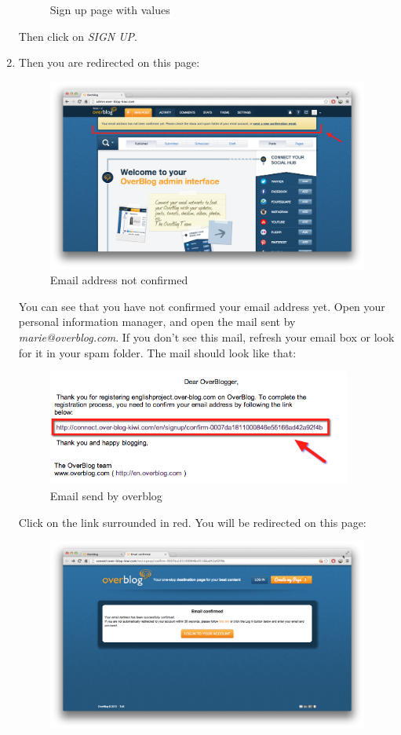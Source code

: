 \documentclass[a4paper,10pt]{article}
\begin{document}
\begin{enumerate}
\begin{figure}[H]
    \caption{Sign up page with values}
\end{figure}
Then click on \emph{SIGN UP}.
\item Then you are redirected on this page:
\begin{figure}[H]
    \center
	\includegraphics[width=13cm]{Images/addressMailNotConfirmed.png}
    \caption{Email address not confirmed}
\end{figure}
You can see that you have not confirmed your email address yet. Open your personal information manager, and open the mail sent by \emph{marie@overblog.com}. If you don't see this mail, refresh your email box or look for it in your spam folder. The mail should look like that: 
\begin{figure}[H]
    \center
	\includegraphics[width=10cm]{Images/emailOverblog.png}
    \caption{Email send by overblog}
\end{figure}
Click on the link surrounded in red. You will be redirected on this page:
\begin{figure}[H]
    \center
	\includegraphics[width=13cm]{Images/addressMailConfirmed.png}

\end{figure}
\end{enumerate}
\end{document}
